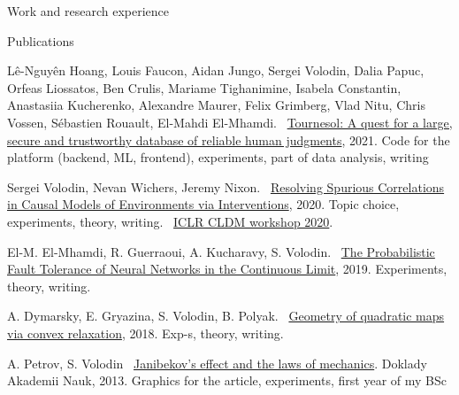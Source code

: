 \documentclass{resume} %
\newcommand*{\mybold}[1]{{\color{pinkunderline} #1}}
\newcommand*{\logo}[1]{%
	\raisebox{-.02\baselineskip}{%
		\texttt{[image: ./img/\\imgpref\#1]}%
	}%
}
\def\imgpref{bleak-}
\newcommand{\mylink}{{\color{gray}\faExternalLink}}
\begin{document}
\begin{rSection}{Work and research experience}
\end{rSection}


\vspace{-1em}
\begin{rSection}{Publications}
\vspace{-1em}
\item L\^{e}-Nguy\^{e}n Hoang, Louis Faucon, Aidan Jungo, \mybold{Sergei Volodin,} Dalia Papuc, Orfeas Liossatos, Ben Crulis, Mariame Tighanimine, Isabela Constantin, Anastasiia Kucherenko, Alexandre Maurer, Felix Grimberg, Vlad Nitu, Chris Vossen, Sébastien Rouault, El-Mahdi El-Mhamdi. \mylink~\href{https://arxiv.org/abs/2107.07334}{Tournesol: A quest for a large, secure and trustworthy database of reliable human judgments}, 2021. Code for the platform (backend, ML, frontend), experiments, part of data analysis, writing
\item \logo{iclr.png} \mybold{Sergei Volodin,} Nevan Wichers, Jeremy Nixon. \mylink~\href{https://arxiv.org/abs/2002.05217}{Resolving Spurious Correlations in Causal Models of Environments via Interventions}, 2020. Topic choice, experiments, theory, writing. \mylink~\href{https://causalrlworkshop.github.io/program/cldm_8.html}{ICLR CLDM workshop 2020}.
\item El-M. El-Mhamdi, R. Guerraoui, A. Kucharavy, \mybold{S. Volodin.} \mylink~\href{https://arxiv.org/abs/1902.01686}{The Probabilistic Fault Tolerance of Neural Networks in the Continuous Limit}, 2019. Experiments, theory,  writing. %
\item A. Dymarsky, E. Gryazina, \mybold{S. Volodin}, B. Polyak. \mylink~\href{https://arxiv.org/abs/1810.00896}{Geometry of quadratic maps via convex relaxation}, 2018. Exp-s, theory, writing.%
\item A. Petrov, \mybold{S. Volodin} \mylink~\href{https://sergia-ch.github.io/other-projects/dj/PHDK349.pdf}{Janibekov's effect and the laws of mechanics}. Doklady Akademii Nauk, 2013. Graphics for the article, experiments, first year of my BSc
\end{rSection}
\end{document}
